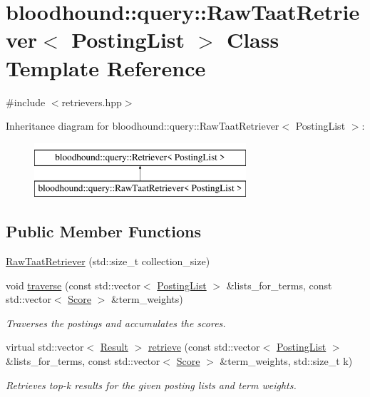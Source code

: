 \hypertarget{classbloodhound_1_1query_1_1RawTaatRetriever}{}\section{bloodhound\+:\+:query\+:\+:Raw\+Taat\+Retriever$<$ Posting\+List $>$ Class Template Reference}
\label{classbloodhound_1_1query_1_1RawTaatRetriever}


{\ttfamily \#include $<$retrievers.\+hpp$>$}

Inheritance diagram for bloodhound\+:\+:query\+:\+:Raw\+Taat\+Retriever$<$ Posting\+List $>$\+:\begin{figure}[H]
\begin{center}
\leavevmode
\includegraphics[height=2.000000cm]{classbloodhound_1_1query_1_1RawTaatRetriever}
\end{center}
\end{figure}
\subsection*{Public Member Functions}
\begin{DoxyCompactItemize}
\item 
\hyperlink{classbloodhound_1_1query_1_1RawTaatRetriever_a859b1cd2092da229964e2795c4445d72}{Raw\+Taat\+Retriever} (std\+::size\+\_\+t collection\+\_\+size)
\item 
void \hyperlink{classbloodhound_1_1query_1_1RawTaatRetriever_a70007a6dd5213e9c28266e38b424ba20}{traverse} (const std\+::vector$<$ \hyperlink{classbloodhound_1_1PostingList}{Posting\+List} $>$ \&lists\+\_\+for\+\_\+terms, const std\+::vector$<$ \hyperlink{structbloodhound_1_1Score}{Score} $>$ \&term\+\_\+weights)
\begin{DoxyCompactList}\small\item\em Traverses the postings and accumulates the scores. \end{DoxyCompactList}\item 
virtual std\+::vector$<$ \hyperlink{structbloodhound_1_1query_1_1Result}{Result} $>$ \hyperlink{classbloodhound_1_1query_1_1RawTaatRetriever_aafaaf842fdaef297a255e28766af2c0d}{retrieve} (const std\+::vector$<$ \hyperlink{classbloodhound_1_1PostingList}{Posting\+List} $>$ \&lists\+\_\+for\+\_\+terms, const std\+::vector$<$ \hyperlink{structbloodhound_1_1Score}{Score} $>$ \&term\+\_\+weights, std\+::size\+\_\+t k)
\begin{DoxyCompactList}\small\item\em Retrieves top-\/k results for the given posting lists and term weights. \end{DoxyCompactList}\end{DoxyCompactItemize}


